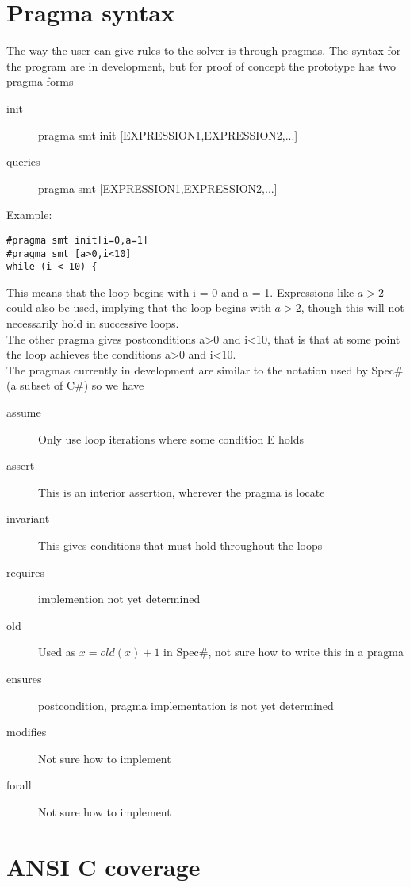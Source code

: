 \documentclass[11pt]{article}
\begin{document}
\section{Pragma syntax}
The way the user can give rules to the solver is through pragmas. The syntax for the program are in development, but for proof of concept the prototype has two pragma forms\\
\begin{description}
\item[init] pragma smt init [EXPRESSION1,EXPRESSION2,...]
\item[queries] pragma smt [EXPRESSION1,EXPRESSION2,...]
\end{description}
Example:
\begin{lstlisting}
#pragma smt init[i=0,a=1]
#pragma smt [a>0,i<10]
while (i < 10) {
\end{lstlisting}
This means that the loop begins with i = 0 and a = 1. Expressions like $a>2$ could also be used, implying that the loop begins with $a>2$, though this will not necessarily hold in successive loops.\\
The other pragma gives postconditions a>0 and i<10, that is that at some point the loop achieves the conditions a>0 and i<10.\\
The pragmas currently in development are similar to the notation used by Spec\# (a subset of C\#) so we have
\begin{description}
\item[assume] Only use loop iterations where some condition E holds
\item[assert] This is an interior assertion, wherever the pragma is locate 
\item[invariant] This gives conditions that must hold throughout the loops
\item[requires] implemention not yet determined
\item[old] Used as $x = old(x)+1$ in Spec\#, not sure how to write this in a pragma
\item[ensures] postcondition, pragma implementation is not yet determined
\item[modifies] Not sure how to implement
\item[forall] Not sure how to implement
\end{description}


\section{ANSI C coverage}
\end{document}
